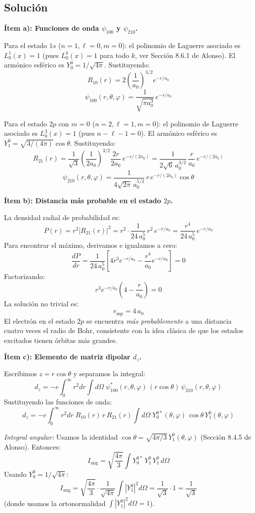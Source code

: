 \documentclass[a4paper]{article}
\begin{document}
\subsection{Solución}

\textbf{Ítem a): Funciones de onda $\psi_{100}$ y $\psi_{210}$.}

Para el estado $1s$ ($n=1, \ell=0, m=0$): el polinomio de Laguerre asociado es $L_{0}^{1}(x) = 1$ (pues $L_0^k(x) = 1$ para todo $k$, ver Sección 8.6.1 de Alonso). El armónico esférico es $Y_0^0 = 1/\sqrt{4\pi}$. Sustituyendo:
$$
R_{10}(r) = 2\left(\frac{1}{a_0}\right)^{3/2} e^{-r/a_0}
$$
$$
\boxed{\psi_{100}(r,\theta,\varphi) = \frac{1}{\sqrt{\pi a_0^3}}\, e^{-r/a_0}}
$$

Para el estado $2p$ con $m=0$ ($n=2, \ell=1, m=0$): el polinomio de Laguerre asociado es $L_{0}^{3}(x) = 1$ (pues $n-\ell-1 = 0$). El armónico esférico es $Y_1^0 = \sqrt{3/(4\pi)}\cos\theta$. Sustituyendo:
$$
R_{21}(r) = \frac{1}{\sqrt{3}}\left(\frac{1}{2a_0}\right)^{3/2} \frac{2r}{2a_0}\, e^{-r/(2a_0)} = \frac{1}{2\sqrt{6}\, a_0^{3/2}}\, \frac{r}{a_0}\, e^{-r/(2a_0)}
$$
$$
\boxed{\psi_{210}(r,\theta,\varphi) = \frac{1}{4\sqrt{2\pi}\, a_0^{5/2}}\, r\, e^{-r/(2a_0)} \cos\theta}
$$

\textbf{Ítem b): Distancia más probable en el estado $2p$.}

La densidad radial de probabilidad es:
$$
P(r) = r^2 |R_{21}(r)|^2 = r^2 \cdot \frac{1}{24\, a_0^5}\, r^2\, e^{-r/a_0} = \frac{r^4}{24\, a_0^5}\, e^{-r/a_0}
$$
Para encontrar el máximo, derivamos e igualamos a cero:
$$
\frac{dP}{dr} = \frac{1}{24\, a_0^5}\left[4r^3 e^{-r/a_0} - \frac{r^4}{a_0} e^{-r/a_0}\right] = 0
$$
Factorizando:
$$
r^3 e^{-r/a_0}\left(4 - \frac{r}{a_0}\right) = 0
$$
La solución no trivial es:
$$
\boxed{r_{\text{mp}} = 4\, a_0}
$$
El electrón en el estado $2p$ se encuentra \textit{más probablemente} a una distancia cuatro veces el radio de Bohr, consistente con la idea clásica de que los estados excitados tienen órbitas más grandes.

\textbf{Ítem c): Elemento de matriz dipolar $d_z$.}

Escribimos $z = r\cos\theta$ y separamos la integral:
$$
d_z = -e \int_0^\infty r^2 dr \int d\Omega\; \psi_{100}^*(r,\theta,\varphi)\, (r\cos\theta)\, \psi_{210}(r,\theta,\varphi)
$$
Sustituyendo las funciones de onda:
$$
d_z = -e \int_0^\infty r^2 dr\; R_{10}(r)\, r\, R_{21}(r) \int d\Omega\; Y_0^{0*}(\theta,\varphi)\, \cos\theta\, Y_1^0(\theta,\varphi)
$$

\textit{Integral angular:} Usamos la identidad $\cos\theta = \sqrt{4\pi/3}\, Y_1^0(\theta,\varphi)$ (Sección 8.4.5 de Alonso). Entonces:
$$
I_{\text{ang}} = \sqrt{\frac{4\pi}{3}} \int Y_0^{0*}\, Y_1^0\, Y_1^0\, d\Omega
$$
Usando $Y_0^0 = 1/\sqrt{4\pi}$:
$$
I_{\text{ang}} = \sqrt{\frac{4\pi}{3}} \cdot \frac{1}{\sqrt{4\pi}} \int |Y_1^0|^2 d\Omega = \frac{1}{\sqrt{3}} \cdot 1 = \frac{1}{\sqrt{3}}
$$
(donde usamos la ortonormalidad $\int |Y_1^0|^2 d\Omega = 1$).
\end{document}
